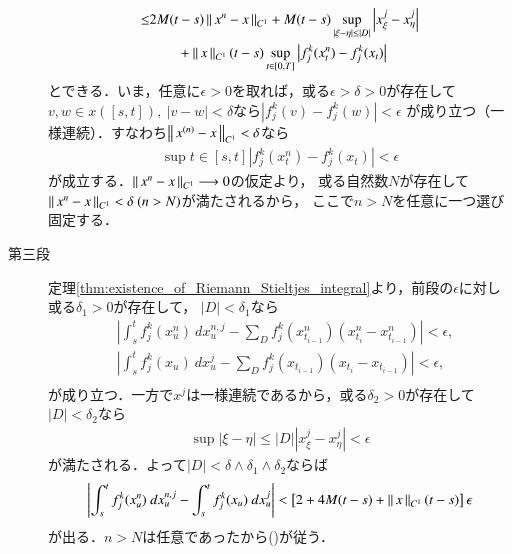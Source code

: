 \begin{prf}
\begin{description}
\begin{align}
				\leq &2M (t - s) \left\|\, x^n - x\, \right\|_{C^1}
					+ M(t-s) \operatorname*{sup}_{|\xi - \eta| \leq |D|} \left|x^j_\xi - x^j_\eta \right| \\
					&\qquad + \left\|\, x\, \right\|_{C^1}(t-s)\operatorname*{sup}_{t \in [0,T]} \left|f^k_j(x^n_t) - f^k_j(x_t) \right|
			\end{align}
			とできる．いま，任意に$\epsilon > 0$を取れば，或る$\epsilon > \delta > 0$が存在して
			$v,w \in x([s,t]),\ |v - w| < \delta$なら$|f^k_j(v) - f^k_j(w)| < \epsilon$
			が成り立つ（一様連続）．すなわち$\left\|\, x^{(n)} - x\, \right\|_{C^1} < \delta$なら
			\begin{align}
				\sup{t \in [s,t]}{\left|f^k_j(x^n_t) - f^k_j(x_t) \right|} < \epsilon
			\end{align}
			が成立する．$\left\|\, x^n - x\, \right\|_{C^1} \longrightarrow 0$の仮定より，
			或る自然数$N$が存在して$\left\|\, x^n - x\, \right\|_{C^1} < \delta\ (n > N)$が満たされるから，
			ここで$n > N$を任意に一つ選び固定する．
		
		\item[第三段] 定理\ref{thm:existence_of_Riemann_Stieltjes_integral}より，前段の$\epsilon$に対し或る$\delta_1 > 0$が存在して，
			$|D| < \delta_1$なら
			\begin{align}
				&\left| \int_s^t f^k_j(x^n_u)\ dx^{n,j}_u
					- \sum_D f^k_j(x^n_{t_{i-1}})(x^n_{t_i} - x^n_{t_{i-1}}) \right| < \epsilon, \\
				&\left| \int_s^t f^k_j(x_u)\ dx^j_u
					- \sum_D f^k_j(x_{t_{i-1}})(x_{t_i} - x_{t_{i-1}}) \right| < \epsilon, \\
			\end{align}
			が成り立つ．一方で$x^j$は一様連続であるから，或る$\delta_2 > 0$が存在して
			$|D| < \delta_2$なら
			\begin{align}
				\sup{|\xi - \eta| \leq |D|}{\left|x^j_\xi - x^j_\eta \right|} < \epsilon
			\end{align}
			が満たされる．よって$|D| < \delta \wedge \delta_1 \wedge \delta_2$ならば
			\begin{align}
				\left| \int_s^t f^k_j(x^n_u)\ dx^{n,j}_u
					- \int_s^t f^k_j(x_u)\ dx^j_u \right|
				< \left[2 + 4M(t-s) + \left\|\, x\, \right\|_{C^1}(t-s) \right] \epsilon
			\end{align}
			が出る．$n > N$は任意であったから()が従う．
			\QED
	\end{description}
\end{prf}

